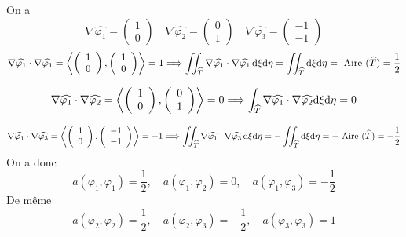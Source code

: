 \documentclass{article}
\def \de {{\rm d}}
\begin{document}
On a 
\[\nabla\widehat{\varphi_1}=\left(\begin{array}{c}
1 \\ 0 \end{array}\right)
\quad 
\nabla\widehat{\varphi_2}=\left(\begin{array}{c}
0 \\ 1 \end{array}\right)
\quad 
\nabla\widehat{\varphi_3}=\left(\begin{array}{c}
-1 \\ -1 \end{array}\right)
\]
\[\nabla\widehat{\varphi_1}\cdot\nabla\widehat{\varphi_1}=\left<\left(\begin{array}{c}1\\0 \end{array}\right),\left(\begin{array}{c}1\\0 \end{array}\right)\right>=1 \Longrightarrow \iint_{\widehat{T}} \nabla\widehat{\varphi_1}\cdot\nabla\widehat{\varphi_1} \,\de \xi\de \eta=\iint_{\widehat{T}} \de \xi\de \eta=\mbox{ Aire }(\widehat{T})=\frac 12 \]

\[\nabla\widehat{\varphi_1}\cdot\nabla\widehat{\varphi_2}=\left<\left(\begin{array}{c}1\\0 \end{array}\right),\left(\begin{array}{c}0\\1 \end{array}\right)\right>=0 \Longrightarrow \int_{\widehat{T}} \nabla\widehat{\varphi_1}\cdot\nabla\widehat{\varphi_2} \de \xi\de \eta =0\]

\[\nabla\widehat{\varphi_1}\cdot\nabla\widehat{\varphi_3}=\left<\left(\begin{array}{c}1\\0 \end{array}\right),\left(\begin{array}{c}-1\\-1 \end{array}\right)\right>=-1 \Longrightarrow \iint_{\widehat{T}} \nabla\widehat{\varphi_1}\cdot\nabla\widehat{\varphi_3} \,\de \xi\de \eta=-\iint_{\widehat{T}} \de \xi\de \eta=-\mbox{ Aire }(\widehat{T})=-\frac 12 \]
On a donc 
\[a(\varphi_1,\varphi_1)=\frac 12,\quad a(\varphi_1,\varphi_2)=0,\quad a(\varphi_1,\varphi_3)=-\frac 12\]
De même
\[a(\varphi_2,\varphi_2)=\frac 12,\quad a(\varphi_2,\varphi_3)=-\frac 12,\quad a(\varphi_3,\varphi_3)= 1\]
\end{document}
